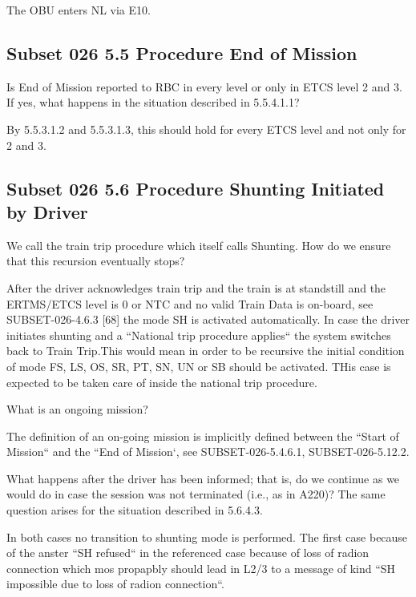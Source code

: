 \documentclass{template/openetcs_article}
\begin{document}
\resolution The OBU enters NL via E10.

\subsection{Subset 026 5.5 Procedure End of Mission}

Is End of Mission reported to RBC in every level or only in ETCS level 2 and 3. If yes, what happens in the situation described in 5.5.4.1.1?

By 5.5.3.1.2 and 5.5.3.1.3, this should hold for every ETCS level and not only for 2 and 3. 



\subsection{Subset 026 5.6 Procedure Shunting Initiated by Driver}

We call the train trip procedure which itself calls Shunting. How do we ensure that this recursion eventually stops?

\resolution After the driver acknowledges train trip and the train is at standstill and the ERTMS/ETCS level is 0 or NTC and no valid Train Data is on-board, see SUBSET-026-4.6.3 [68] the mode SH is activated automatically. In case the driver initiates shunting and a ``National trip procedure applies`` the system switches back to Train Trip.This would mean in order to be recursive the initial condition of mode FS, LS, OS, SR, PT, SN, UN or SB should be activated. THis case is expected to be taken care of inside the national trip procedure.

What is an ongoing mission?

\resolution The definition of an on-going mission is implicitly defined between the ``Start of Mission`` and the ``End of Mission`, see SUBSET-026-5.4.6.1, SUBSET-026-5.12.2.

What happens after the driver has been informed; that is, do we continue as we would do in case the session was not terminated (i.e., as in A220)? The same question arises for the situation described in 5.6.4.3.

\resolution In both cases no transition to shunting mode is performed. The first case because of the anster ``SH refused`` in the referenced case because of loss of radion connection which mos propapbly should lead in L2/3 to a message of kind ``SH impossible due to loss of radion connection``.
\end{document}
